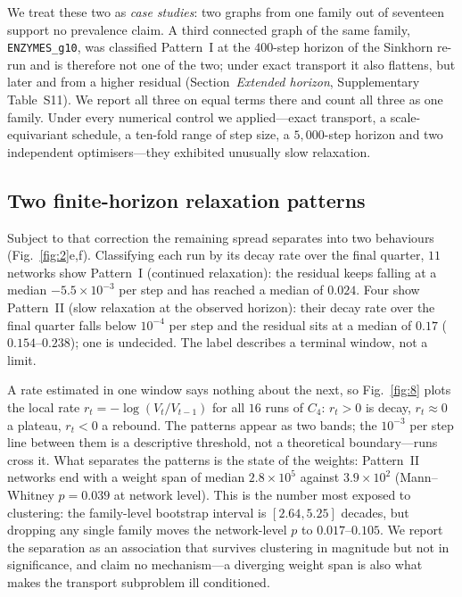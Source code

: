 \documentclass[11pt]{article}
\begin{document}
We treat these two as \emph{case studies}: two graphs from one family out of seventeen support no prevalence claim. A third connected graph of the same family,
\texttt{ENZYMES\_g10}, was classified Pattern~I at the $400$-step horizon of
the {Sinkhorn} re-run and is therefore not one of the two; under exact
transport it also flattens, but later and from a higher residual
(Section~\emph{Extended horizon}, Supplementary Table~S11). We report all
three on equal terms there and count all three as one family. Under every numerical control we applied---exact transport, a
scale-equivariant schedule, a ten-fold range of step size, a $5{,}000$-step
horizon and two independent optimisers---they exhibited unusually slow
relaxation.
\subsection*{Two finite-horizon relaxation patterns}

Subject to that correction the remaining spread separates into two behaviours
(Fig.~\ref{fig:2}e,f). Classifying each run by its decay rate over the final
quarter, $11$ networks show Pattern~I (continued relaxation): the residual keeps
falling at a median $-5.5\times10^{-3}$ per step and has reached a median of
$0.024$. Four show Pattern~II (slow relaxation at the observed horizon): their
decay rate over the final quarter falls below $10^{-4}$ per step and the
residual sits at a median of
$0.17$ ($0.154$--$0.238$); one is undecided. The label describes a terminal
window, not a limit.

A rate estimated in one window says nothing about the next, so
Fig.~\ref{fig:8} plots the local rate $r_t=-\log(V_t/V_{t-1})$ for all $16$
runs of $C_4$: $r_t>0$ is decay, $r_t\approx0$ a plateau, $r_t<0$ a rebound.
The patterns appear as two bands; the $10^{-3}$ per step line between them is a
descriptive threshold, not a theoretical boundary---runs cross it. What separates the patterns is the state of the weights: Pattern~II
networks end with a weight span of median $2.8\times10^{5}$ against
$3.9\times10^{2}$ (Mann--Whitney $p=0.039$ at network level). This is the
number most exposed to clustering: the family-level bootstrap interval is
$[2.64,5.25]$ decades, but dropping any single family moves the network-level
$p$ to $0.017$--$0.105$. We report the separation as an association that
survives clustering in magnitude but not in significance, and claim no
mechanism---a diverging weight span is also what makes the transport subproblem
ill conditioned.
\end{document}
